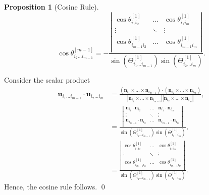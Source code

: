 \documentclass[fleqn,11pt,twoside]{article}
\makeatletter
\renewenvironment{proof}[1][\proofname]{\par
  \normalfont
  \topsep6\p@\@plus6\p@ \trivlist
  \item[\hskip\labelsep\textbf{%
    #1\@addpunct{.}}]\ignorespaces
}{%
  \qed\endtrivlist
}
\theoremstyle{definition}
\newtheorem{prop}{Proposition}
\makeatother
\begin{document}
\begin{prop}[Cosine Rule]
\begin{equation}
\cos\theta^{[m-1]}_{i_2\dots i_{m-1}}=-\frac{\left|\begin{array}{ccc}
\cos\theta^{[1]}_{i_1i_2}&\dots &\cos\theta^{[1]}_{i_1i_m}\\
\vdots & \ddots & \vdots\\
\cos\theta^{[1]}_{i_{m-1}i_2} &\dots &\cos\theta^{[1]}_{i_{m-1}i_m}\\
\end{array}\right|}
{\sin\left(\Theta^{[1]}_{i_1\dots i_{m-1}}\right)\sin\left(\Theta^{[1]}_{i_2\dots i_{m}}\right)}.
\end{equation}
\end{prop}

\begin{proof}
Consider the scalar product
\begin{equation}
\begin{split}
\mathbf{u}_{i_1\dots i_{m-1}}\cdot\mathbf{u}_{i_2\dots i_{m}}&=\frac{(\mathbf{n}_{i_1}\times\dots\times\mathbf{n}_{i_{m-1}})\cdot(\mathbf{n}_{i_2}\times\dots\times\mathbf{n}_{i_{m}})}
{|\mathbf{n}_{i_1}\times\dots\times\mathbf{n}_{i_{m-1}}||\mathbf{n}_{i_2}\times\dots\times\mathbf{n}_{i_{m}}|},\\
&=\frac{\left|\begin{array}{ccc}
\mathbf{n}_{i_1}\cdot\mathbf{n}_{i_2}&\dots&\mathbf{n}_{i_1}\cdot\mathbf{n}_{i_m}\\
\vdots &\ddots & \vdots\\
\mathbf{n}_{i_{m-1}}\cdot\mathbf{n}_{i_2}&\dots&\mathbf{n}_{i_{m-1}}\cdot\mathbf{n}_{i_m}\\
\end{array}\right|}
{\sin\left(\Theta^{[1]}_{i_1\dots i_{m-1}}\right)\sin\left(\Theta^{[1]}_{i_2\dots i_{m}}\right)},\\
&=\frac{\left|\begin{array}{ccc}
\cos\theta^{[1]}_{i_1i_2}&\dots &\cos\theta^{[1]}_{i_1i_m}\\
\vdots & \ddots & \vdots\\
\cos\theta^{[1]}_{i_{m-1}i_2} &\dots &\cos\theta^{[1]}_{i_{m-1}i_m}\\
\end{array}\right|}
{\sin\left(\Theta^{[1]}_{i_1\dots i_{m-1}}\right)\sin\left(\Theta^{[1]}_{i_2\dots i_{m}}\right)}.
\end{split}
\end{equation}
Hence, the cosine rule follows.
\end{proof}
\end{document}
